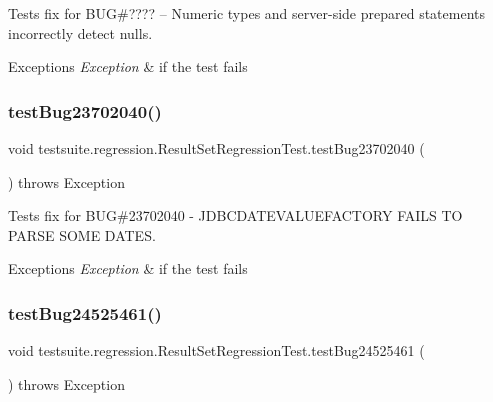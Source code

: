 Tests fix for B\+UG\#???? -- Numeric types and server-\/side prepared statements incorrectly detect nulls.


\begin{DoxyExceptions}{Exceptions}
{\em Exception} & if the test fails \\
\hline
\end{DoxyExceptions}
\mbox{\label{classtestsuite_1_1regression_1_1_result_set_regression_test_aeea941d7e449375b72a8322fc87a9b06}} 
\subsubsection{\texorpdfstring{test\+Bug23702040()}{testBug23702040()}}
{\footnotesize\ttfamily void testsuite.\+regression.\+Result\+Set\+Regression\+Test.\+test\+Bug23702040 (\begin{DoxyParamCaption}{ }\end{DoxyParamCaption}) throws Exception}

Tests fix for B\+UG\#23702040 -\/ J\+D\+B\+C\+D\+A\+T\+E\+V\+A\+L\+U\+E\+F\+A\+C\+T\+O\+RY F\+A\+I\+LS TO P\+A\+R\+SE S\+O\+ME D\+A\+T\+ES.


\begin{DoxyExceptions}{Exceptions}
{\em Exception} & if the test fails \\
\hline
\end{DoxyExceptions}
\mbox{\label{classtestsuite_1_1regression_1_1_result_set_regression_test_a448319c15d5ce9214d504185c6c3db4b}} 
\subsubsection{\texorpdfstring{test\+Bug24525461()}{testBug24525461()}}
{\footnotesize\ttfamily void testsuite.\+regression.\+Result\+Set\+Regression\+Test.\+test\+Bug24525461 (\begin{DoxyParamCaption}{ }\end{DoxyParamCaption}) throws Exception}

